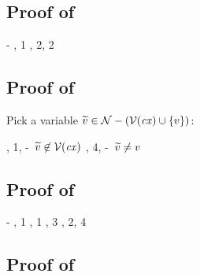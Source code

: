 \subsection*{Proof of }

\begin{derivation}
\step{\cxwfO}
     {\hyp}
\step{\hastyO{\abs{\varfx}{\bool}{\varfx}}{\tarr{\bool}{\bool}}}
     {\Reidbool, 1}
\step{\hastyO{(\eq{\abs{\varfx}{\bool}{\varfx}}{\abs{\varfx}{\bool}{\varfx}})}
             {\bool}}
     {\Reeq, 2, 2}
\end{derivation}



\subsection*{Proof of }

Pick a variable $\widetilde{v}\in\mathcal{N}-(\mathcal{V}(\mathit{cx})\cup\{v\})$:
\begin{derivation}
\step{\istyO{\typ}}{\hyp}
\step{\cxwf{\snoc{\cx}{\vdec{\vaR}{\typ}}}}
     {\RcxvdecI, 1, \hyp\ $\widetilde{v}\not\in\mathcal{V}(\mathit{cx})$}
\step{\hastyO{\abs{\var}{\typ}{\true}}{\tarr{\typ}{\bool}}}
     {\Reabsalpha, 4, \hyp\ $\widetilde{v}\neq v$}
\end{derivation}



\subsection*{Proof of }

\begin{derivation}
\step{\cxwfO}
     {\hyp}
\step{\hastyO{\abs{\varfx}{\bool}{\varfx}}{\tarr{\bool}{\bool}}}
     {\Reidbool, 1}
\step{\istyO{\bool}}
     {\Rtbool, 1}
\step{\hastyO{\abs{\varfx}{\bool}{\true}}{\tarr{\bool}{\bool}}}
     {\Reconsttrue, 3}
\step{\hastyO{(\eq{\abs{\varfx}{\bool}{\varfx}}{\abs{\varfx}{\bool}{\true}})}
             {\bool}}
     {\Reeq, 2, 4}
\end{derivation}



\subsection*{Proof of }

